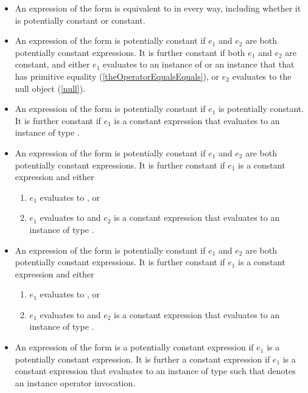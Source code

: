 \documentclass[makeidx]{article}
\begin{document}
{\begin{itemize}
\item
  An expression of the form  is
  equivalent to  in every way,
  including whether it is potentially constant or constant.

\item
  An expression of the form  is potentially constant
  if $e_1$ and $e_2$ are both potentially constant expressions.
  It is further constant if both $e_1$ and $e_2$ are constant, and
  either $e_1$ evaluates to an instance of 
  or an instance that that has primitive equality
  (\ref{theOperatorEqualsEquals}),
  or $e_2$ evaluates to the null object
  (\ref{null}).

\item
  An expression of the form  is potentially constant
  if $e_1$ is potentially constant.
  It is further constant if $e_1$ is a constant expression that evaluates to
  an instance of type .

\item
  An expression of the form  is
  potentially constant if $e_1$ and $e_2$
  are both potentially constant expressions.
  It is further constant if $e_1$ is a constant expression and either
  \begin{enumerate}
  \item $e_1$ evaluates to \FALSE, or
  \item $e_1$ evaluates to \TRUE{} and $e_2$ is a constant expression
    that evaluates to an instance of type .
  \end{enumerate}

\item
  An expression of the form  is
  potentially constant if $e_1$ and $e_2$
  are both potentially constant expressions.
  It is further constant if $e_1$ is a constant expression and either
  \begin{enumerate}
  \item $e_1$ evaluates to \TRUE, or
  \item $e_1$ evaluates to \FALSE{} and $e_2$ is a constant expression
    that evaluates to an instance of type .
  \end{enumerate}

\item
  An expression of the form  is
  a potentially constant expression
  if $e_1$ is a potentially constant expression.
  It is further a constant expression if $e_1$ is
  a constant expression that evaluates to an instance of type 
  such that \gtilde{} denotes an instance operator invocation.


\end{itemize}}
\end{document}
